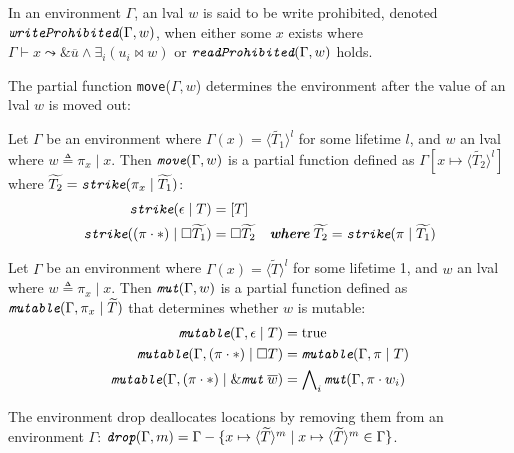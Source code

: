 \begin{subappendices}
\begin{definition}
\end{definition}
\begin{definition} In an environment $\Gamma$, an lval $w$ is said to be write prohibited, denoted $\emph{\texttt{writeProhibited}}(\Gamma, w)$, when either some $x$ exists where $\Gamma \vdash x \leadsto \&\overline{u} \land \exists_i (u_i \bowtie w)$ or $\emph{\texttt{readProhibited}}(\Gamma, w)$ holds.
\end{definition}
The partial function \texttt{move}($\Gamma, w$) determines the environment after the value of an lval $w$ is moved out:
\begin{definition}[Move] Let $\Gamma$ be an environment where $\Gamma(x) = \langle \widetilde{T_1} \rangle^l$ for some lifetime $l$, and $w$ an lval where $w \triangleq \pi_x \mid x$. Then $\emph{\texttt{move}}(\Gamma, w)$ is a partial function defined as $\Gamma[x \mapsto \langle \widetilde{T_2} \rangle^l]$ where $\widetilde{T_2} = \emph{\texttt{strike}}(\pi_x \mid \widetilde{T_1})$:
\[
\begin{aligned}
\emph{\texttt{strike}}(\epsilon \mid T) &= [T] \\
\emph{\texttt{strike}}((\pi \cdot *) \mid \square \widetilde{T_1}) &= \square \widetilde{T_2} \quad \emph{\textbf{where}}\; \widetilde{T_2} = \emph{\texttt{strike}}(\pi \mid \widetilde{T_1})
\end{aligned}
\]
\end{definition}
\begin{definition}[Mutable] Let $\Gamma$ be an environment where $\Gamma(x) = \langle \widetilde{T} \rangle^l$ for some lifetime 1, and $w$ an lval where $w \triangleq \pi_x \mid x$. Then $\emph{\texttt{mut}}(\Gamma, w)$ is a partial function defined as $\emph{\texttt{mutable}}(\Gamma, \pi_x \mid \widetilde{T})$ that determines whether $w$ is mutable:
\[
\begin{aligned}
\emph{\texttt{mutable}}(\Gamma, \epsilon \mid T) &= \text{true} \\
\emph{\texttt{mutable}}(\Gamma, (\pi \cdot *) \mid \square T) &= \emph{\texttt{mutable}}(\Gamma, \pi \mid T) \\
\emph{\texttt{mutable}}(\Gamma, (\pi \cdot *) \mid \&\emph{\texttt{mut}}\; \overline{w}) &= \bigwedge\nolimits_{i}\emph{\texttt{mut}}(\Gamma, \pi \cdot w_i)
\end{aligned}
\] 
\end{definition}
\begin{definition} The environment drop deallocates locations by removing them from an environment $\Gamma$: $\emph{\texttt{drop}}(\Gamma, m) = \Gamma - \{ x \mapsto \langle \widetilde{T} \rangle^m \mid x \mapsto \langle \widetilde{T} \rangle^m \in \Gamma \}$.

\end{definition}
\end{subappendices}
